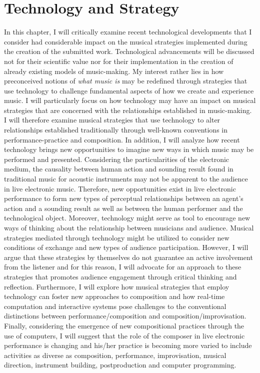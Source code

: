 \hypertarget{chapter4}{}
\chapter{Technology and Strategy}

In this chapter, I will critically examine recent technological developments that I consider had considerable impact on the musical strategies implemented during the creation of the submitted work. Technological advancements will be discussed not for their scientific value nor for their implementation in the creation of already existing models of music-making. My interest rather lies in how preconceived notions of \emph{what music is} may be redefined through strategies that use technology to challenge fundamental aspects of how we create and experience music. I will particularly focus on how technology may have an impact on musical strategies that are concerned with the relationships established in music-making. I will therefore examine musical strategies that use technology to alter relationships established traditionally through well-known conventions in performance-practice and composition. In addition, I will analyze how recent technology brings new opportunities to imagine new ways in which music may be performed and presented. Considering the particularities of the electronic medium, the causality between human action and sounding result found in traditional music for acoustic instruments may not be apparent to the audience in live electronic music. Therefore, new opportunities exist in live electronic performance to form new types of perceptual relationships between an agent's action and a sounding result as well as between the human performer and the technological object. Moreover, technology might serve as tool to encourage new ways of thinking about the relationship between musicians and audience. Musical strategies mediated through technology might be utilized to consider new conditions of exchange and new types of audience participation. However, I will argue that these strategies by themselves do not guarantee an active involvement from the listener and for this reason, I will advocate for an approach to these strategies that promotes audience engagement through critical thinking and reflection. Furthermore, I will explore how musical strategies that employ technology can foster new approaches to composition and how real-time computation and interactive systems pose challenges to the conventional distinctions between performance/composition and composition/improvisation. Finally, considering the emergence of new compositional practices through the use of computers, I will suggest that the role of the composer in live electronic performance is changing and his/her practice is becoming more varied to include activities as diverse as composition, performance, improvisation, musical direction, instrument building, postproduction and computer programming.

